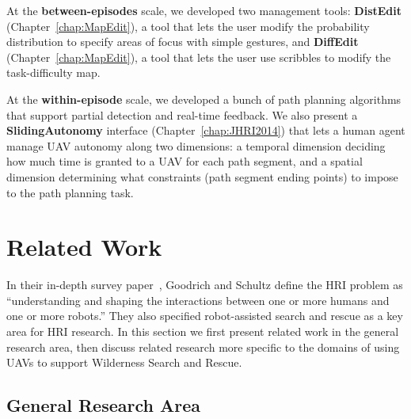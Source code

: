 At the \textbf{between-episodes} scale, we developed two management tools: \textbf{DistEdit} (Chapter~\ref{chap:MapEdit}), a tool that lets the user modify the probability distribution to specify areas of focus with simple gestures, and \textbf{DiffEdit} (Chapter~\ref{chap:MapEdit}), a tool that lets the user use scribbles to modify the task-difficulty map. 

At the \textbf{within-episode} scale, we developed a bunch of path planning algorithms that support partial detection and real-time feedback. We also present a \textbf{SlidingAutonomy} interface (Chapter~\ref{chap:JHRI2014}) that lets a human agent manage UAV autonomy along two dimensions: a temporal dimension deciding how much time is granted to a UAV for each path segment, and a spatial dimension determining what  constraints (path segment ending points) to impose to the path planning task.


\section{Related Work}
\label{related}

In their in-depth survey paper~\cite{Goodrich2007HRISurvey}, Goodrich and Schultz define the HRI problem as ``understanding and shaping the interactions between one or more humans and one or more robots.'' They also specified robot-assisted search and rescue as a key area for HRI research. In this section we first present related work in the general research area, then discuss related research more specific to the domains of using UAVs to support Wilderness Search and Rescue.

\subsection{General Research Area}


